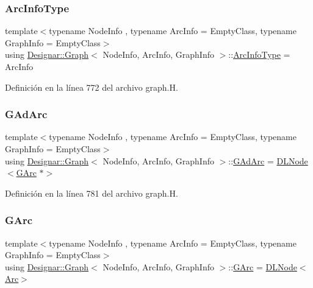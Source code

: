 \subsubsection{\texorpdfstring{Arc\+Info\+Type}{ArcInfoType}}
{\footnotesize\ttfamily template$<$typename Node\+Info , typename Arc\+Info  = Empty\+Class, typename Graph\+Info  = Empty\+Class$>$ \\
using \hyperlink{class_designar_1_1_graph}{Designar\+::\+Graph}$<$ Node\+Info, Arc\+Info, Graph\+Info $>$\+::\hyperlink{class_designar_1_1_graph_abc2adb4841a6d092d5093f9e60f2c8be}{Arc\+Info\+Type} =  Arc\+Info}



Definición en la línea 772 del archivo graph.\+H.

\mbox{\label{class_designar_1_1_graph_a7d00558995946c5653522148b54971bc}} 
\subsubsection{\texorpdfstring{G\+Ad\+Arc}{GAdArc}}
{\footnotesize\ttfamily template$<$typename Node\+Info , typename Arc\+Info  = Empty\+Class, typename Graph\+Info  = Empty\+Class$>$ \\
using \hyperlink{class_designar_1_1_graph}{Designar\+::\+Graph}$<$ Node\+Info, Arc\+Info, Graph\+Info $>$\+::\hyperlink{class_designar_1_1_graph_a7d00558995946c5653522148b54971bc}{G\+Ad\+Arc} =  \hyperlink{class_designar_1_1_d_l_node}{D\+L\+Node}$<$\hyperlink{class_designar_1_1_graph_a5ad9e18b71899c2d4979426e367e5573}{G\+Arc} $\ast$$>$\hspace{0.3cm}{\ttfamily [protected]}}



Definición en la línea 781 del archivo graph.\+H.

\mbox{\label{class_designar_1_1_graph_a5ad9e18b71899c2d4979426e367e5573}} 
\subsubsection{\texorpdfstring{G\+Arc}{GArc}}
{\footnotesize\ttfamily template$<$typename Node\+Info , typename Arc\+Info  = Empty\+Class, typename Graph\+Info  = Empty\+Class$>$ \\
using \hyperlink{class_designar_1_1_graph}{Designar\+::\+Graph}$<$ Node\+Info, Arc\+Info, Graph\+Info $>$\+::\hyperlink{class_designar_1_1_graph_a5ad9e18b71899c2d4979426e367e5573}{G\+Arc} =  \hyperlink{class_designar_1_1_d_l_node}{D\+L\+Node}$<$\hyperlink{class_designar_1_1_graph_a74c730ef4ce2d20f998d72bd25c2b5bf}{Arc}$>$\hspace{0.3cm}{\ttfamily [protected]}}



